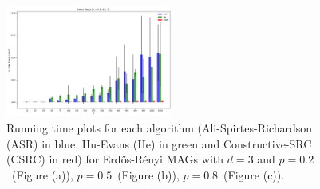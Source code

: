 \documentclass[a4paper]{article}
\begin{document}
\begin{figure}[htbp]
	\centering
	\hfill
	
	\includegraphics[width=0.49\textwidth]{figures/Figure_6.png}
	
	\caption{Running time plots for each algorithm (Ali-Spirtes-Richardson (ASR) in blue, Hu-Evans (He) in green and Constructive-SRC (CSRC) in red) for Erd\H{o}s-R\'{e}nyi MAGs with $d=3$ and $p=0.2$~(Figure (a)), $p=0.5$~(Figure (b)), $p=0.8$~(Figure (c)).}
	\label{fig:er-3-ap}
\end{figure}
\end{document}
